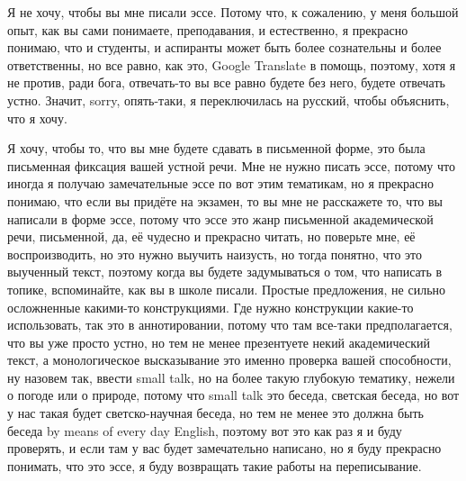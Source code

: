 \documentclass[main.tex]{subfiles}
\begin{document}
Я не хочу, чтобы вы мне писали эссе.
Потому что, к сожалению, у меня большой опыт, как вы сами понимаете, преподавания, и естественно, я прекрасно понимаю, что и студенты, и аспиранты может быть более сознательны и более ответственны, но все равно, как это, Google Translate в помощь, поэтому, хотя я не против, ради бога, отвечать-то вы все равно будете без него, будете отвечать устно.
Значит, sorry, опять-таки, я переключилась на русский, чтобы объяснить, что я хочу.

Я хочу, чтобы то, что вы мне будете сдавать в письменной форме, это была письменная фиксация вашей устной речи.
Мне не нужно писать эссе, потому что иногда я получаю замечательные эссе по вот этим тематикам, но я прекрасно понимаю, что если вы придёте на экзамен, то вы мне не расскажете то, что вы написали в форме эссе, потому что эссе это жанр письменной академической речи, письменной, да, её чудесно и прекрасно читать, но поверьте мне, её воспроизводить, но это нужно выучить наизусть, но тогда понятно, что это выученный текст, поэтому когда вы будете задумываться о том, что написать в топике, вспоминайте, как вы в школе писали.
Простые предложения, не сильно осложненные какими-то конструкциями.
Где нужно конструкции какие-то использовать, так это в аннотировании, потому что там все-таки предполагается, что вы уже просто устно, но тем не менее презентуете некий академический текст, а монологическое высказывание это именно проверка вашей способности, ну назовем так, ввести small talk, но на более такую глубокую тематику, нежели о погоде или о природе, потому что small talk это беседа, светская беседа, но вот у нас такая будет светско-научная беседа, но тем не менее это должна быть беседа by means of every day English, поэтому вот это как раз я и буду проверять, и если там у вас будет замечательно написано, но я буду прекрасно понимать, что это эссе, я буду возвращать такие работы на переписывание.
\end{document}
